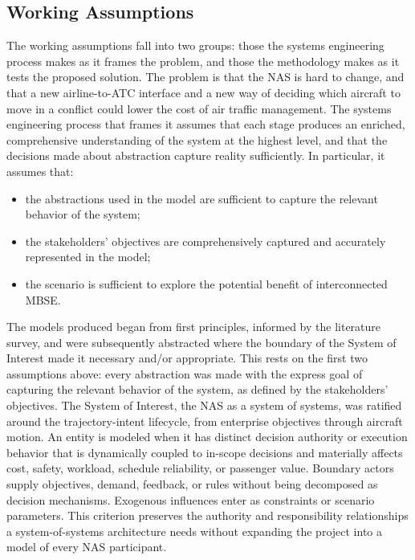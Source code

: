 \subsection{Working Assumptions}
\label{sec:assumptions}

The working assumptions fall into two groups: those the systems engineering process makes as it frames the problem, and those the methodology makes as it tests the proposed solution. The problem is that the NAS is hard to change, and that a new airline-to-ATC interface and a new way of deciding which aircraft to move in a conflict could lower the cost of air traffic management. The systems engineering process that frames it assumes that each stage produces an enriched, comprehensive understanding of the system at the highest level, and that the decisions made about abstraction capture reality sufficiently. In particular, it assumes that:
\begin{itemize}
    \item the abstractions used in the model are sufficient to capture the relevant behavior of the system;
    \item the stakeholders' objectives are comprehensively captured and accurately represented in the model;
    \item the scenario is sufficient to explore the potential benefit of interconnected MBSE.
\end{itemize}

The models produced began from first principles, informed by the literature survey, and were subsequently abstracted where the boundary of the System of Interest made it necessary and/or appropriate. This rests on the first two assumptions above: every abstraction was made with the express goal of capturing the relevant behavior of the system, as defined by the stakeholders' objectives. The System of Interest, the NAS as a system of systems, was ratified around the trajectory-intent lifecycle, from enterprise objectives through aircraft motion. An entity is modeled when it has distinct decision authority or execution behavior that is dynamically coupled to in-scope decisions and materially affects cost, safety, workload, schedule reliability, or passenger value. Boundary actors supply objectives, demand, feedback, or rules without being decomposed as decision mechanisms. Exogenous influences enter as constraints or scenario parameters. This criterion preserves the authority and responsibility relationships a system-of-systems architecture needs without expanding the project into a model of every NAS participant.

